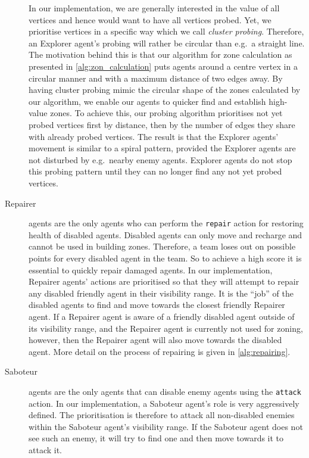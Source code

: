 \begin{description}
        In our implementation, we are generally interested in the value of all vertices and hence would want to have all vertices probed.
        Yet, we prioritise vertices in a specific way which we call \emph{cluster probing}.
        Therefore, an Explorer agent's probing will rather be circular than e.g.\ a straight line.
        The motivation behind this is that our algorithm for zone calculation as presented in \autoref{alg:zon_calculation} puts agents around a centre vertex in a circular manner and with a maximum distance of two edges away.
        By having cluster probing mimic the circular shape of the zones calculated by our algorithm, we enable our agents to quicker find and establish high-value zones.
        To achieve this, our probing algorithm prioritises not yet probed vertices first by distance, then by the number of edges they share with already probed vertices.
        The result is that the Explorer agents' movement is similar to a spiral pattern, provided the Explorer agents are not disturbed by e.g.\ nearby enemy agents.
        Explorer agents do not stop this probing pattern until they can no longer find any not yet probed vertices.
    \item[Repairer] agents are the only agents who can perform the \texttt{repair} action for restoring health of disabled agents.
        Disabled agents can only move and recharge and cannot be used in building zones.
        Therefore, a team loses out on possible points for every disabled agent in the team.
        So to achieve a high score it is essential to quickly repair damaged agents.
        In our implementation, Repairer agents' actions are prioritised so that they will attempt to repair any disabled friendly agent in their visibility range.
        It is the \enquote{job} of the disabled agents to find and move towards the closest friendly Repairer agent.
        If a Repairer agent is aware of a friendly disabled agent outside of its visibility range, and the Repairer agent is currently not used for zoning, however, then the Repairer agent will also move towards the disabled agent.
        More detail on the process of repairing is given in \autoref{alg:repairing}.
    \item[Saboteur] agents are the only agents that can disable enemy agents using the \texttt{attack} action.
        In our implementation, a Saboteur agent's role is very aggressively defined.
        The prioritisation is therefore to attack all non-disabled enemies within the Saboteur agent's visibility range.
        If the Saboteur agent does not see such an enemy, it will try to find one and then move towards it to attack it.


\end{description}
